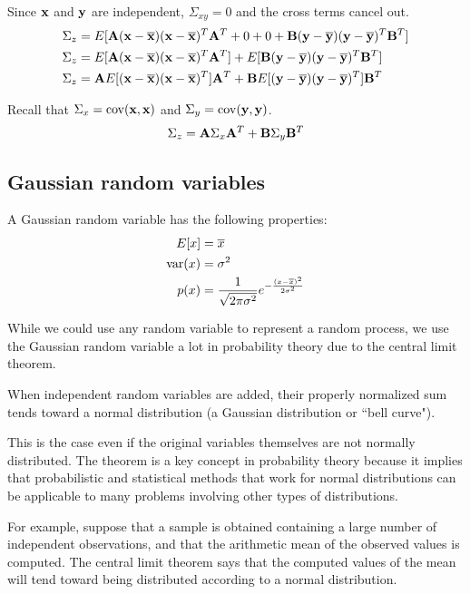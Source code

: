 Since $\mathbf{x}$ and $\mathbf{y}$ are independent, $\Sigma_{xy} = 0$ and the cross
terms cancel out.
\begin{align*}
  \Sigma_z &= E[
    \mathbf{A}(\mathbf{x} - \overline{\mathbf{x}})(\mathbf{x} - \overline{\mathbf{x}})^T\mathbf{A}^T + 0 + 0 +
    \mathbf{B}(\mathbf{y} - \overline{\mathbf{y}})(\mathbf{y} - \overline{\mathbf{y}})^T\mathbf{B}^T] \\
  \Sigma_z &=
    E[\mathbf{A}(\mathbf{x} - \overline{\mathbf{x}})(\mathbf{x} - \overline{\mathbf{x}})^T\mathbf{A}^T] +
    E[\mathbf{B}(\mathbf{y} - \overline{\mathbf{y}})(\mathbf{y} - \overline{\mathbf{y}})^T\mathbf{B}^T] \\
  \Sigma_z &=
    \mathbf{A}E[(\mathbf{x} - \overline{\mathbf{x}})(\mathbf{x} - \overline{\mathbf{x}})^T]\mathbf{A}^T +
    \mathbf{B}E[(\mathbf{y} - \overline{\mathbf{y}})(\mathbf{y} - \overline{\mathbf{y}})^T]\mathbf{B}^T
\end{align*}

Recall that $\Sigma_x = \operatorname{cov}(\mathbf{x}, \mathbf{x})$ and
$\Sigma_y = \operatorname{cov}(\mathbf{y}, \mathbf{y})$.
\begin{equation*}
  \Sigma_z = \mathbf{A}\Sigma_x\mathbf{A}^T + \mathbf{B}\Sigma_y\mathbf{B}^T
\end{equation*}

\subsection{Gaussian random variables}

A Gaussian random variable has the following properties:
\begin{align*}
  E[x] &= \overline{x} \\
  \operatorname{var}(x) &= \sigma^2 \\
  p(x) &= \frac{1}{\sqrt{2\pi\sigma^2}}
    e^{-\frac{(x - \overline{x})^2}{2\sigma^2}}
\end{align*}

While we could use any random variable to represent a random process, we use the
Gaussian random variable a lot in probability theory due to the central limit
theorem.
\begin{definition}
  When independent random variables are added, their properly normalized sum
  tends toward a normal distribution (a Gaussian distribution or ``bell curve").
\end{definition}

This is the case even if the original variables themselves are not normally
distributed. The theorem is a key concept in probability theory because it
implies that probabilistic and statistical methods that work for normal
distributions can be applicable to many problems involving other types of
distributions.

For example, suppose that a sample is obtained containing a large number of
independent observations, and that the arithmetic mean of the observed values
is computed. The central limit theorem says that the computed values of the
mean will tend toward being distributed according to a normal distribution.

